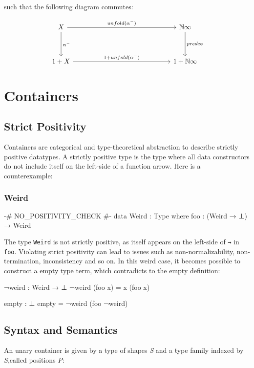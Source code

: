 such that the following diagram commutes:

\[
\begin{tikzcd}[row sep=huge, column sep=5.0cm]
X \arrow[r, "unfold(\alpha^{-})"] \arrow[d, "\alpha^{-}"]
& \mathbb{N}\infty \arrow[d, "pred\infty"] \\
1 + X \arrow[r, "1 + unfold(\alpha^{-})"]
& 1 + \mathbb{N}\infty
\end{tikzcd}
\]

\section{Containers}

\subsection{Strict Positivity}

Containers are categorical and type-theoretical abstraction to describe strictly positive datatypes. A strictly positive type is the type where all data constructors do not include itself on the left-side of a function arrow. Here is a counterexample:

\subsubsection*{Weird}

\begin{code}
{-# NO_POSITIVITY_CHECK #-}
data Weird : Type where
  foo : (Weird → ⊥) → Weird
\end{code}

The type \texttt{Weird} is not strictly positive, as itself appears on the left-side of \texttt{→} in \texttt{foo}. Violating strict positivity can lead to issues such as non-normalizability, non-termination, inconsistency and so on. In this weird case, it becomes possible to construct a empty type term, which contradicts to the empty definition:

\begin{code}
¬weird : Weird → ⊥
¬weird (foo x) = x (foo x)

empty : ⊥
empty = ¬weird (foo ¬weird)
\end{code}

\subsection{Syntax and Semantics}

An unary container is given by a type of shapes \textit{S} and a type family indexed by \textit{S},called positions \textit{P}:

